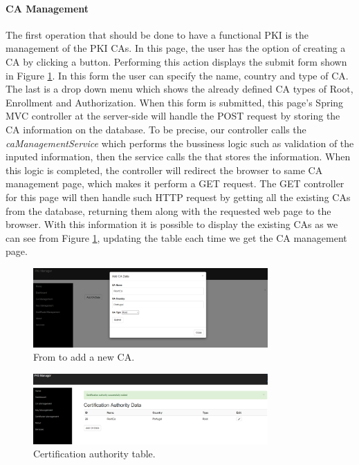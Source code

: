 \paragraph{CA Management}
The first operation that should be done to have a functional PKI is the management of the PKI CAs. In this page, the user has the option of creating a CA by clicking a button. Performing this action displays the submit form shown in Figure \ref{fig:manager1}. In this form the user can specify the name, country and type of CA. The last is a drop down menu which shows the already defined CA types of Root, Enrollment and Authorization. When this form is submitted, this page's Spring MVC controller at the server-side will handle the POST request by storing the CA information on the database. To be precise, our controller calls the \textit{caManagementService} which performs the bussiness logic such as validation of the inputed information, then the service calls the  that stores the information. When this logic is completed, the controller will redirect the browser to same CA management page, which makes it perform a GET request. The GET controller for this page will then handle such HTTP request by getting all the existing CAs from the database, returning them along with the requested web page to the browser. With this information it is possible to display the existing CAs as we can see from Figure \ref{fig:manager1}, updating the table each time we get the CA management page. 

\begin{figure}[!h]
	\centering
	\includegraphics[width=0.8\textwidth]{Figures/manager1}
	\caption{\label{fig:manager1}From to add a new CA.}
\end{figure}

\begin{figure}[!h]
	\centering
	\includegraphics[width=0.8\textwidth]{Figures/manager2}
	\caption{\label{fig:manager2}Certification authority table.}
\end{figure}


